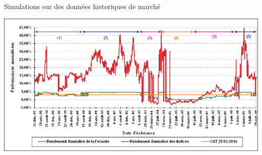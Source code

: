 \documentclass[french,12pt,a4paper]{article}
\begin{document}
\begin{center}
\caption{Simulations sur des données historiques de marché}
\end{center}

\begin{center}
\includegraphics[scale=0.5]{simulations_historiques.png}
\end{center}
\end{document}
